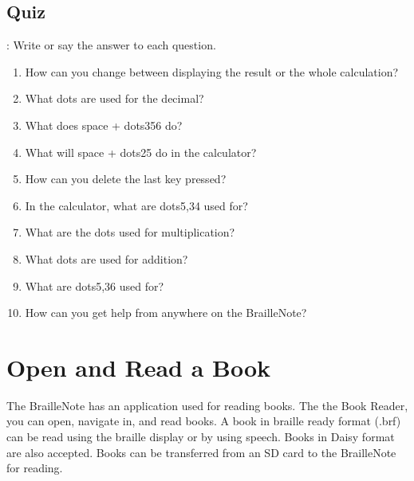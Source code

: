 \documentclass[10pt,letterpaper,twoside]{report}
\begin{document}
{\subsection{Quiz}:
Write or say the answer to each question.
\begin{enumerate}
	\item How can you change between displaying the result or the whole calculation?
	\item What dots are used for the decimal?
	\item What does space + dots356 do?
	\item What will space + dots25 do in the calculator?
	\item How can you delete the last key pressed?
	\item In the calculator, what are dots5,34 used for?
	\item What are the dots used for multiplication?
	\item What dots are used for addition?
	\item What are dots5,36 used for?
	\item How can you get help from anywhere on the BrailleNote?
\end{enumerate}

\clearpage
\section{Open and Read a Book}
The BrailleNote has an application used for reading books. The the Book Reader, you can open, navigate in, and read books. A book in braille ready format (.brf) can be read using the braille display or by using speech. Books in Daisy format are also accepted. Books can be transferred from an SD card to the BrailleNote for reading.
}
\end{document}
